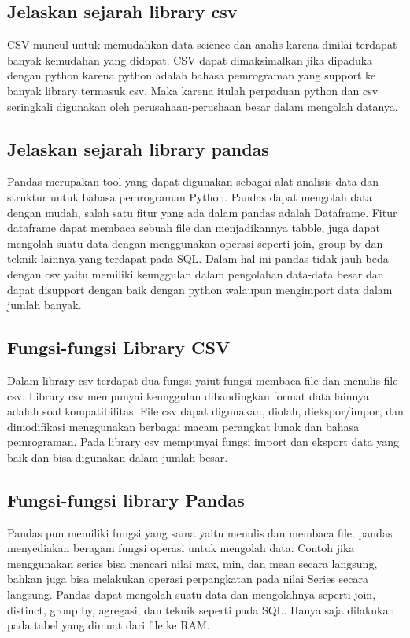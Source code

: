\subsection{Jelaskan sejarah library csv}
CSV muncul untuk memudahkan data science dan analis karena dinilai terdapat banyak kemudahan yang didapat. CSV dapat dimaksimalkan jika dipaduka dengan python karena python adalah bahasa pemrograman yang support ke banyak library termasuk csv. Maka karena itulah perpaduan python dan csv seringkali digunakan oleh perusahaan-perushaan besar dalam mengolah datanya.
\subsection{Jelaskan sejarah library pandas}
Pandas merupakan tool yang dapat digunakan sebagai alat analisis data dan struktur untuk bahasa pemrograman Python. Pandas dapat mengolah data dengan mudah, salah satu fitur yang ada dalam pandas adalah Dataframe. Fitur dataframe dapat membaca sebuah file dan menjadikannya tabble, juga dapat mengolah suatu data dengan menggunakan operasi seperti join, group by dan teknik lainnya yang terdapat pada SQL. Dalam hal ini pandas tidak jauh beda dengan csv yaitu memiliki keunggulan dalam pengolahan data-data besar dan dapat disupport dengan baik dengan python walaupun mengimport data dalam jumlah banyak.
\subsection{Fungsi-fungsi Library CSV}
Dalam library csv terdapat dua fungsi yaiut fungsi membaca file dan menulis file csv.
Library csv mempunyai keunggulan dibandingkan format data lainnya adalah soal kompatibilitas. File csv dapat digunakan, diolah, diekspor/impor, dan dimodifikasi menggunakan berbagai macam perangkat lunak dan bahasa pemrograman. Pada library csv mempunyai fungsi import dan eksport data yang baik dan bisa digunakan dalam jumlah besar.
\subsection{Fungsi-fungsi library Pandas}
Pandas pun memiliki fungsi yang sama yaitu menulis dan membaca file. pandas menyediakan beragam fungsi operasi untuk mengolah data. Contoh jika menggunakan series bisa mencari nilai max, min, dan mean secara langsung, bahkan juga bisa melakukan operasi perpangkatan pada nilai Series secara langsung.
Pandas dapat mengolah suatu data dan mengolahnya seperti join, distinct, group by, agregasi, dan teknik seperti pada SQL. Hanya saja dilakukan pada tabel yang dimuat dari file ke RAM.
